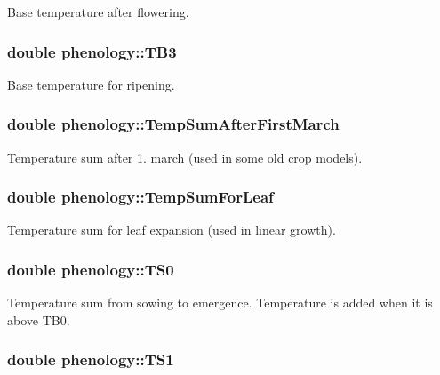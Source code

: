 Base temperature after flowering. \hypertarget{classphenology_aa561df2c5bfcf20a8158dd5d4e0aa961}{
\subsubsection[{TB3}]{\setlength{\rightskip}{0pt plus 5cm}double {\bf phenology::TB3}}}
\label{classphenology_aa561df2c5bfcf20a8158dd5d4e0aa961}


Base temperature for ripening. \hypertarget{classphenology_adc95767d0894610e7f3e90045b4fd254}{
\subsubsection[{TempSumAfterFirstMarch}]{\setlength{\rightskip}{0pt plus 5cm}double {\bf phenology::TempSumAfterFirstMarch}}}
\label{classphenology_adc95767d0894610e7f3e90045b4fd254}


Temperature sum after 1. march (used in some old \hyperlink{classcrop}{crop} models). \hypertarget{classphenology_ac59e649ce2b4cede632496fbc6de53e1}{
\subsubsection[{TempSumForLeaf}]{\setlength{\rightskip}{0pt plus 5cm}double {\bf phenology::TempSumForLeaf}}}
\label{classphenology_ac59e649ce2b4cede632496fbc6de53e1}


Temperature sum for leaf expansion (used in linear growth). \hypertarget{classphenology_a8073c2ccadc82c47d32973c4c8b6bce9}{
\subsubsection[{TS0}]{\setlength{\rightskip}{0pt plus 5cm}double {\bf phenology::TS0}}}
\label{classphenology_a8073c2ccadc82c47d32973c4c8b6bce9}


Temperature sum from sowing to emergence. Temperature is added when it is above TB0. \hypertarget{classphenology_a85182e67e41bcb74aaa61a5f81874e77}{
\subsubsection[{TS1}]{\setlength{\rightskip}{0pt plus 5cm}double {\bf phenology::TS1}}}
\label{classphenology_a85182e67e41bcb74aaa61a5f81874e77}



